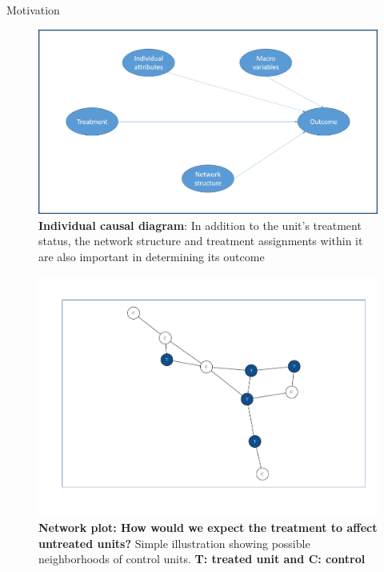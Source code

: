 \documentclass[final]{beamer}
\newlength{\onecolwid}
\newlength{\onecolwidd}
\begin{document}
\begin{frame}[t]
\begin{columns}[t]
\begin{column}{\onecolwidd}
\begin{block}{Motivation}
\begin{rmfamily}
	\vspace*{.3in}	
\centering
\begin{figure}
\centering
\includegraphics[scale=0.8]{Individual_structure.png}
\vspace*{5mm}
\caption{\small \textbf{Individual causal diagram}: In addition to the unit's treatment status, the network structure and treatment assignments within it are also important in determining its outcome}
\end{figure}
\vspace*{-10mm}
\centering
\begin{figure}
\centering
\includegraphics[scale=0.8]{Dummy_network.pdf}
\vspace*{-15mm}
\caption{\small \textbf{Network plot: How would we expect the treatment to affect untreated units?} Simple illustration showing possible neighborhoods of control units. \textbf{T: treated unit and C: control}}
\end{figure}	
	

\end{rmfamily}
\end{block}
\end{column}
\end{columns}
\end{frame}
\end{document}
